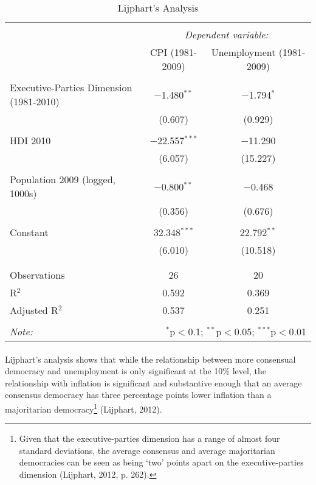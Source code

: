 \documentclass[11pt, oneside]{article}   	%
\let\oldparagraph\paragraph
\renewcommand{\paragraph}[1]{\oldparagraph{#1}\mbox{}}
\begin{document}
\begin{table}[!htbp] \centering 
  \caption{Lijphart's Analysis} 
  \label{} 
\small 
\begin{tabular}{@{\extracolsep{-10pt}}lcc} 
\\[-1.8ex]\hline 
\hline \\[-1.8ex] 
 & \multicolumn{2}{c}{\textit{Dependent variable:}} \\ 
\cline{2-3} 
 & CPI (1981-2009) & Unemployment (1981-2009) \\ 
\hline \\[-1.8ex] 
 Executive-Parties Dimension (1981-2010) & $-$1.480$^{**}$ & $-$1.794$^{*}$ \\ 
  & (0.607) & (0.929) \\ 
  & & \\ 
 HDI 2010 & $-$22.557$^{***}$ & $-$11.290 \\ 
  & (6.057) & (15.227) \\ 
  & & \\ 
 Population 2009 (logged, 1000s) & $-$0.800$^{**}$ & $-$0.468 \\ 
  & (0.356) & (0.676) \\ 
  & & \\ 
 Constant & 32.348$^{***}$ & 22.792$^{**}$ \\ 
  & (6.010) & (10.518) \\ 
  & & \\ 
\hline \\[-1.8ex] 
Observations & 26 & 20 \\ 
R$^{2}$ & 0.592 & 0.369 \\ 
Adjusted R$^{2}$ & 0.537 & 0.251 \\ 
\hline 
\hline \\[-1.8ex] 
\textit{Note:}  & \multicolumn{2}{r}{$^{*}$p$<$0.1; $^{**}$p$<$0.05; $^{***}$p$<$0.01} \\ 
\end{tabular} 
\end{table} 


\paragraph{}
Lijphart’s analysis shows that while the relationship between more consensual democracy and unemployment is only significant at the 10\% level, the relationship with inflation is significant and substantive enough that an average consensus democracy has three percentage points lower inflation than a majoritarian democracy\footnote{Given that the executive-parties dimension has a range of almost four standard deviations, the average consensus and average majoritarian democracies can be seen as being ‘two’ points apart on the executive-parties dimension (Lijphart, 2012, p. 262).} (Lijphart, 2012).
\end{document}
